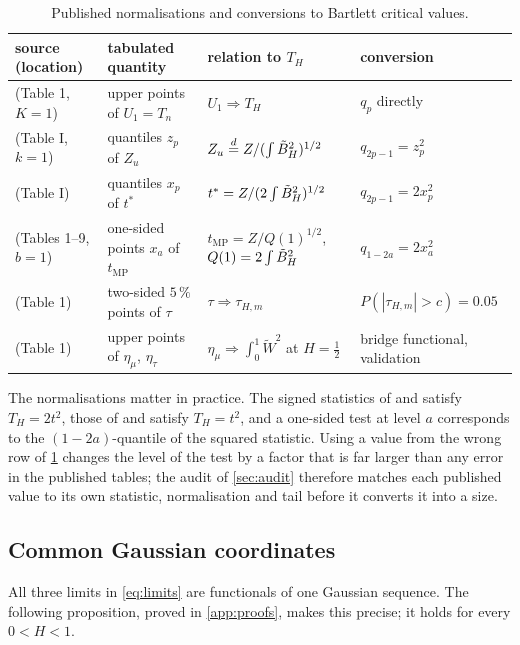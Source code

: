 \begin{table}[tbp]\centering\small
\caption{Published normalisations and conversions to Bartlett critical values.}\label{tab:norm}
\footnotesize\setlength{\tabcolsep}{4pt}
\begin{tabular}{@{}>{\raggedright}p{}>{\raggedright}p{}>{\raggedright}p{}>{\raggedright\arraybackslash}p{}@{}}\toprule
source (location) & tabulated quantity & relation to $T_H$ & conversion\\\midrule
\citet{Lob01} (Table 1, $K=1$) & upper points of $U_1=T_n$ & $U_1\Rightarrow T_H$ & $q_p$ directly\\
\citet{AP97} (Table I, $k=1$) & quantiles $z_p$ of $Z_u$ & $Z_u\overset d=Z/(\int\tilde B_H^2)^{1/2}$ \citep{AP02} & $q_{2p-1}=z_p^2$\\
\citet{KV02} (Table I) & quantiles $x_p$ of $t^\ast$ & $t^\ast=Z/(2\int\tilde B_H^2)^{1/2}$ & $q_{2p-1}=2x_p^2$\\
\citet{MP09} (Tables 1--9, $b=1$) & one-sided points $x_a$ of $t_{\mathrm{MP}}$ & $t_{\mathrm{MP}}=Z/Q(1)^{1/2}$, $Q(1)=2\int\tilde B_H^2$ & $q_{1-2a}=2x_a^2$\\
\citet{HI17} (Table 1) & two-sided $5\,\%$ points of $\tau$ & $\tau\Rightarrow\tau_{H,m}$ & $P(|\tau_{H,m}|>c)=0.05$\\
\citet{KPSS92} (Table 1) & upper points of $\eta_\mu$, $\eta_\tau$ & $\eta_\mu\Rightarrow\int_0^1\tilde W^2$ at $H=\frac12$ & bridge functional, validation\\
\bottomrule\end{tabular}
\end{table}

The normalisations matter in practice. The signed statistics of \citet{KV02} and \citet{MP12} satisfy $T_H=2t^2$, those of
\citet{KVB00} and \citet{AP97} satisfy $T_H=t^2$, and a one-sided test at level $a$ corresponds to the $(1-2a)$-quantile of
the squared statistic. Using a value from the wrong row of \cref{tab:norm} changes the level of the test by a factor
that is far larger than any error in the published tables; the audit of \cref{sec:audit} therefore matches each
published value to its own statistic, normalisation and tail before it converts it into a size.

\subsection{Common Gaussian coordinates}
All three limits in \eqref{eq:limits} are functionals of one Gaussian sequence. The following proposition, proved in
\cref{app:proofs}, makes this precise; it holds for every $0<H<1$.


